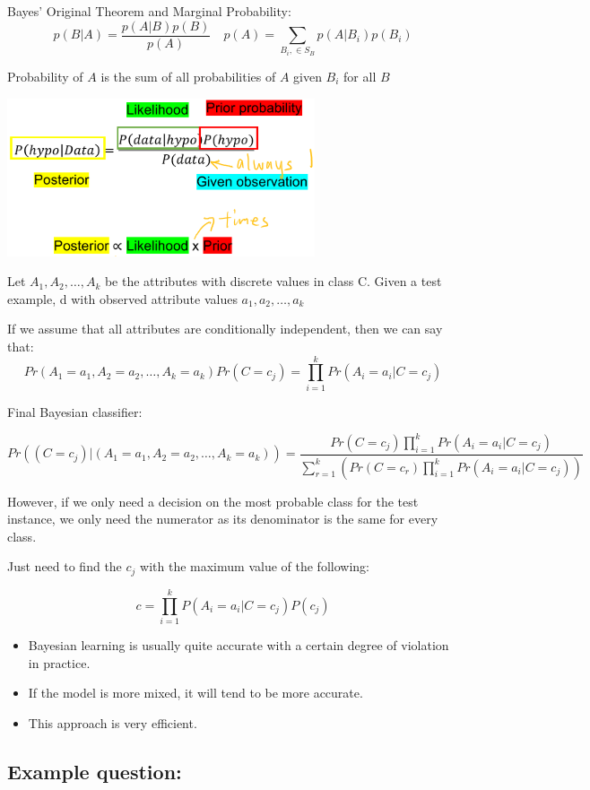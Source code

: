 \documentclass[letterpaper,12pt]{article}
\begin{document}
Bayes' Original Theorem and Marginal Probability:
\[
    p(B|A)=\frac{p(A|B)p(B)}{p(A)}    \quad p(A)=\sum_{B_i,\in S_B}p(A|B_i)p(B_i)
\]

Probability of $A$ is the sum of all probabilities of $A$ given $B_i$ for all
$B$

\includegraphics{./Image/Bayesian.png}

Let $A_1, A_2, \ldots, A_k$ be the attributes with discrete values in class C.
Given a test example, d with observed attribute values $a_1, a_2, \ldots, a_k$

If we assume that all attributes are conditionally independent, then we can say
that:
\[
    Pr(A_1=a_1, A_2=a_2,\ldots,A_k=a_k)Pr(C=c_j)=\prod_{i=1}^{k}Pr(A_i=a_i|C=c_j)
\]

Final Bayesian classifier:

\[
    Pr((C=c_j)| (A_1=a_1, A_2=a_2,\ldots,A_k=a_k)) = \frac{Pr(C=c_j)\prod_{i=1}^{k}Pr(A_i=a_i|C=c_j)}{\sum_{r=1}^{k}(Pr(C=c_r)\prod_{i=1}^{k}Pr(A_i=a_i|C=c_j))}
\]

However, if we only need a decision on the most probable class for the test
instance, we only need the numerator as its denominator is the same for every
class.

Just need to find the $c_j$ with the maximum value of the following:

\[
    c = \prod_{i=1}^{k}P(A_i=a_i|C=c_j)P(c_j)
\]

\begin{itemize}
    \item Bayesian learning is usually quite accurate with a certain degree of violation
          in practice.
    \item If the model is more mixed, it will tend to be more accurate.
    \item This approach is very efficient.
\end{itemize}

\subsection{Example question:}
\end{document}

